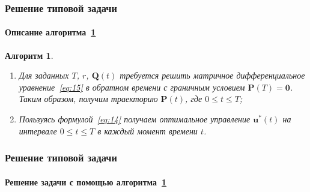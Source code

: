 \documentclass[ignorenonframetext,hyperref={pdftex,unicode,pdfpagelabels=false},compress]{beamer}
\newtheorem{alg}{Алгоритм}
\begin{document}
\begin{frame}
	\frametitle{Решение типовой задачи}
	\framesubtitle{Описание алгоритма~\ref{alg:1}}
    
    \begin{alg}\label{alg:1}~
        \begin{enumerate}
            \item
                Для заданных $T$, $r$, $\mathbf{Q}(t)$ требуется решить матричное дифференциальное уравнение~\ref{eq:15} в обратном времени с граничным условием $\mathbf{P}(T) = \mathbf{0}$. Таким образом, получим траекторию $\mathbf{P}(t)$, где $0 \leqslant t \leqslant T$;

            \item
                Пользуясь формулой~\ref{eq:14} получаем оптимальное управление $\mathbf{u}^*(t)$ на интервале $0 \leqslant t \leqslant T$ в каждый момент времени $t$.
        \end{enumerate}
    \end{alg}
\end{frame}



\begin{frame}
	\frametitle{Решение типовой задачи}
	\framesubtitle{Решение задачи с помощью алгоритма~\ref{alg:1}}
    
    \begin{figure}\center
        
        \label{fig:alg1}
    \end{figure}
\end{frame}
\end{document}
